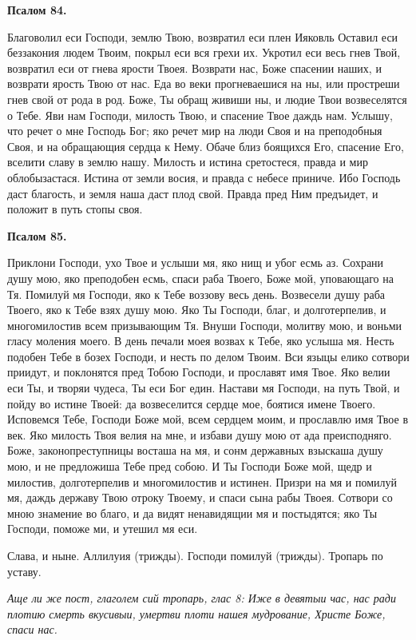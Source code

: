 \bfseries Псалом 84.\normalfont{}\nopagebreak


Благоволил еси Господи, землю Твою, возвратил еси плен Ияковль Оставил еси беззакония людем Твоим, покрыл еси вся грехи их. Укротил еси весь гнев Твой, возвратил еси от гнева ярости Твоея. Возврати нас, Боже спасении наших, и возврати ярость Твою от нас. Еда во веки прогневаешися на ны, или простреши гнев свой от рода в род. Боже, Ты обращ живиши ны, и людие Твои возвеселятся о Тебе. Яви нам Господи, милость Твою, и спасение Твое даждь нам. Услышу, что речет о мне Господь Бог; яко речет мир на люди Своя и на преподобныя Своя, и на обращающия сердца к Нему. Обаче близ боящихся Его, спасение Его, вселити славу в землю нашу. Милость и истина сретостеся, правда и мир облобызастася. Истина от земли восия, и правда с небесе приниче. Ибо Господь даст благость, и земля наша даст плод свой. Правда пред Ним предъидет, и положит в путь стопы своя.


\medskip


\bfseries Псалом 85.\normalfont{}\nopagebreak


Приклони Господи, ухо Твое и услыши мя, яко нищ и убог есмь аз. Сохрани душу мою, яко преподобен есмь, спаси раба Твоего, Боже мой, уповающаго на Тя. Помилуй мя Господи, яко к Тебе воззову весь день. Возвесели душу раба Твоего, яко к Тебе взях душу мою. Яко Ты Господи, благ, и долготерпелив, и многомилостив всем призывающим Тя. Внуши Господи, молитву мою, и воньми гласу моления моего. В день печали моея возвах к Тебе, яко услыша мя. Несть подобен Тебе в бозех Господи, и несть по делом Твоим. Вси языцы елико сотвори приидут, и поклонятся пред Тобою Господи, и прославят имя Твое. Яко велии еси Ты, и творяи чудеса, Ты еси Бог един. Настави мя Господи, на путь Твой, и пойду во истине Твоей: да возвеселится сердце мое, боятися имене Твоего. Исповемся Тебе, Господи Боже мой, всем сердцем моим, и прославлю имя Твое в век. Яко милость Твоя велия на мне, и избави душу мою от ада преисподняго. Боже, законопреступницы восташа на мя, и сонм державных взыскаша душу мою, и не предложиша Тебе пред собою. И Ты Господи Боже мой, щедр и милостив, долготерпелив и многомилостив и истинен. Призри на мя и помилуй мя, даждь державу Твою отроку Твоему, и спаси сына рабы Твоея. Сотвори со мною знамение во благо, и да видят ненавидящии мя и постыдятся; яко Ты Господи, поможе ми, и утешил мя еси.

Слава, и ныне. Аллилуия (трижды). Господи помилуй (трижды). Тропарь по уставу.


\itshape Аще ли же пост, глаголем сий тропарь, глас 8:\normalfont{} Иже в девятыи час, нас ради плотию смерть вкусивыи, умертви плоти нашея мудрование, Христе Боже, спаси нас.


